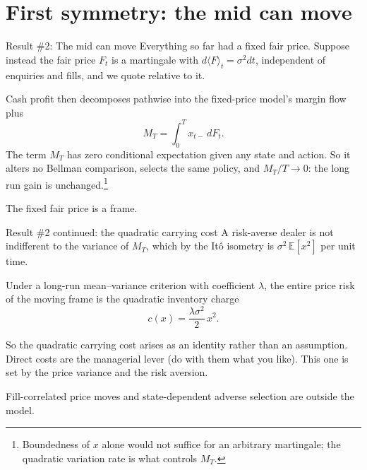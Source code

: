 \documentclass[10pt]{beamer}
\newcommand{\blue}[1]{\textcolor{pcblue}{#1}}
\begin{document}
\section{First symmetry: the mid can move}

\begin{frame}{Result \#2: The mid can move}
Everything so far had a fixed fair price. Suppose instead the fair price $F_t$ is a martingale with $d\langle F\rangle_t = \sigma^2 dt$, independent of enquiries and fills, and we quote relative to it.
\vspace{1em}

Cash profit then decomposes pathwise into the fixed-price model's margin flow plus
\begin{equation}
M_T = \int_0^T x_{t-}\, dF_t .
\end{equation}
The term $M_T$ has zero conditional expectation given any state and action. So it alters no Bellman comparison, selects the same policy, and $M_T/T \to 0$: the long run gain is unchanged.\footnote{Boundedness of $x$ alone would not suffice for an arbitrary martingale; the quadratic variation rate is what controls $M_T$.}
\vspace{1em}

\blue{The fixed fair price is a frame.}
\end{frame}

\begin{frame}{Result \#2 continued: the quadratic carrying cost}
A risk-averse dealer is not indifferent to the variance of $M_T$, which by the It\^o isometry is $\sigma^2\,\mathbb{E}[x^2]$ per unit time.
\vspace{1em}

Under a long-run mean--variance criterion with coefficient $\lambda$, the entire price risk of the moving frame is the quadratic inventory charge
\begin{equation}
c(x) = \frac{\lambda \sigma^2}{2}\, x^2 .
\end{equation}
\vspace{0.5em}

So the quadratic carrying cost arises as an identity rather than an assumption. Direct costs are the managerial lever (do with them what you like). This one is set by the price variance and the risk aversion.
\vspace{1em}

Fill-correlated price moves and state-dependent adverse selection are outside the model.
\end{frame}
\end{document}
